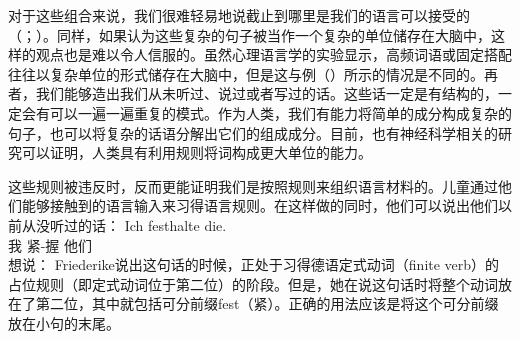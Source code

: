 对于这些组合来说，我们很难轻易地说截止到哪里是我们的语言可以接受的（\citealp[]{Harris57a}；\citealp[]{Chomsky57a}）。同样，如果认为这些复杂的句子被当作一个复杂的单位储存在大脑中，这样的观点也是难以令人信服的。虽然心理语言学的实验显示，高频词语或固定搭配往往以复杂单位的形式储存在大脑中，但是这与例（）所示的情况是不同的。再者，我们能够造出我们从未听过、说过或者写过的话。这些话一定是有结构的，一定会有可以一遍一遍重复的模式。作为人类，我们有能力将简单的成分构成复杂的句子，也可以将复杂的话语分解出它们的组成成分。目前，也有神经科学相关的研究可以证明，人类具有利用规则将词构成更大单位的能力。\citep[]{Pulvermueller2010a}

这些规则被违反时，反而更能证明我们是按照规则来组织语言材料的。儿童通过他们能够接触到的语言输入来习得语言规则。在这样做的同时，他们可以说出他们以前从没听过的话：
\ea
\settowidth{}
\gll Ich festhalte die. \\
     我 紧-握 他们\\
\glt 想说：
\z
Friederike说出这句话的时候，正处于习得德语定式动词（finite verb）的占位规则（即定式动词位于第二位）的阶段。但是，她在说这句话时将整个动词放在了第二位，其中就包括可分前缀fest（紧）。正确的用法应该是将这个可分前缀放在小句的末尾。

